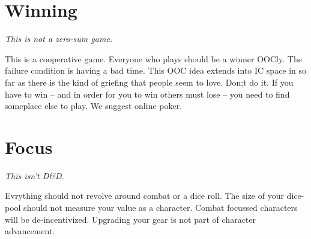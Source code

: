 \section{Winning}
{\em This is not a zero-sum game.}

This is a cooperative game. Everyone who plays should be a winner
OOCly. The failure condition is having a bad time. This OOC idea extends
into IC space in so far as there is the kind of griefing that people
seem to love. Don;t do it.  If you have to win -- and in order for you
to win others must lose -- you need to find someplace else to play. We
suggest online poker.
\section{Focus}
{\em This isn't D\&D.}

Evrything should not revolve around combat or a dice roll. The size
of your dice-pool should not measure your value as a character. Combat
focussed characters will be de-incentivized. Upgrading your gear is not
part of character advancement.

